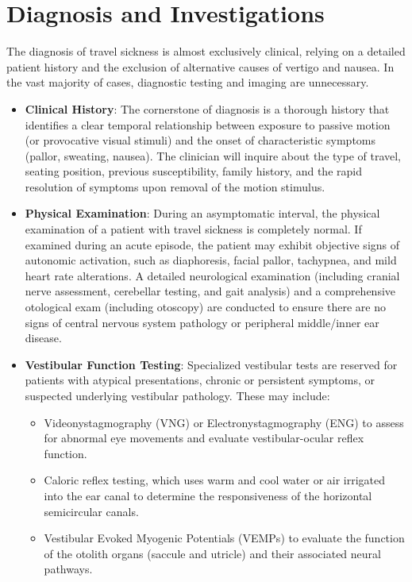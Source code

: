 \section*{Diagnosis and Investigations}
The diagnosis of travel sickness is almost exclusively clinical, relying on a detailed patient history and the exclusion of alternative causes of vertigo and nausea. In the vast majority of cases, diagnostic testing and imaging are unnecessary.
\begin{itemize}
    \item \textbf{Clinical History}: The cornerstone of diagnosis is a thorough history that identifies a clear temporal relationship between exposure to passive motion (or provocative visual stimuli) and the onset of characteristic symptoms (pallor, sweating, nausea). The clinician will inquire about the type of travel, seating position, previous susceptibility, family history, and the rapid resolution of symptoms upon removal of the motion stimulus.
    \item \textbf{Physical Examination}: During an asymptomatic interval, the physical examination of a patient with travel sickness is completely normal. If examined during an acute episode, the patient may exhibit objective signs of autonomic activation, such as diaphoresis, facial pallor, tachypnea, and mild heart rate alterations. A detailed neurological examination (including cranial nerve assessment, cerebellar testing, and gait analysis) and a comprehensive otological exam (including otoscopy) are conducted to ensure there are no signs of central nervous system pathology or peripheral middle/inner ear disease.
    \item \textbf{Vestibular Function Testing}: Specialized vestibular tests are reserved for patients with atypical presentations, chronic or persistent symptoms, or suspected underlying vestibular pathology. These may include:
    \begin{itemize}
        \item Videonystagmography (VNG) or Electronystagmography (ENG) to assess for abnormal eye movements and evaluate vestibular-ocular reflex function.
        \item Caloric reflex testing, which uses warm and cool water or air irrigated into the ear canal to determine the responsiveness of the horizontal semicircular canals.
        \item Vestibular Evoked Myogenic Potentials (VEMPs) to evaluate the function of the otolith organs (saccule and utricle) and their associated neural pathways.

\end{itemize}
\end{itemize}
